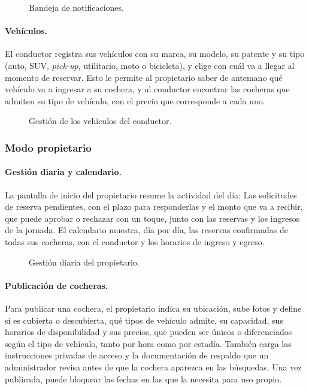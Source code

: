 \begin{figure}[H]
\centering
{}
\caption{Bandeja de notificaciones.}
\label{fig:app_notificaciones}
\end{figure}

\paragraph{Vehículos.} El conductor registra sus vehículos con su marca, su modelo, su patente y su tipo (auto, SUV, \textit{pick-up}, utilitario, moto o bicicleta), y elige con cuál va a llegar al momento de reservar. Esto le permite al propietario saber de antemano qué vehículo va a ingresar a su cochera, y al conductor encontrar las cocheras que admiten su tipo de vehículo, con el precio que corresponde a cada uno.

\begin{figure}[H]
\centering
{}\hspace{0.06\textwidth}
\caption{Gestión de los vehículos del conductor.}
\label{fig:app_vehiculos}
\end{figure}

\subsubsection{Modo propietario}

\paragraph{Gestión diaria y calendario.} La pantalla de inicio del propietario resume la actividad del día: Las solicitudes de reserva pendientes, con el plazo para responderlas y el monto que va a recibir, que puede aprobar o rechazar con un toque, junto con las reservas y los ingresos de la jornada. El calendario muestra, día por día, las reservas confirmadas de todas sus cocheras, con el conductor y los horarios de ingreso y egreso.

\begin{figure}[H]
\centering
{}\hspace{0.06\textwidth}
\caption{Gestión diaria del propietario.}
\label{fig:app_propietario}
\end{figure}

\paragraph{Publicación de cocheras.} Para publicar una cochera, el propietario indica su ubicación, sube fotos y define si es cubierta o descubierta, qué tipos de vehículo admite, su capacidad, sus horarios de disponibilidad y sus precios, que pueden ser únicos o diferenciados según el tipo de vehículo, tanto por hora como por estadía. También carga las instrucciones privadas de acceso y la documentación de respaldo que un administrador revisa antes de que la cochera aparezca en las búsquedas. Una vez publicada, puede bloquear las fechas en las que la necesita para uso propio.

